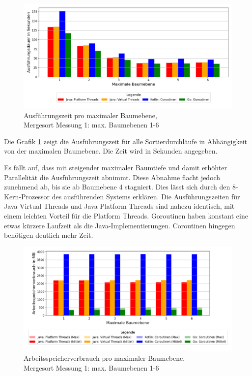 \documentclass[fontsize=12pt,paper=a4,twoside=semi,parskip=half-,headsepline,headinclude]{scrreprt}
\begin{document}
\begin{figure}[H]
	\centering
	\includegraphics[scale=0.5]{figures/mergesort/Maximalebauebenen1-6/execution_time_plot.png}
	\caption{Ausführungszeit pro maximaler Baumebene,\\ Mergesort Messung 1: max. Baumebenen 1-6}
	\label{fig:ms1-6Zeit}
\end{figure}

Die Grafik \ref{fig:ms1-6Zeit} zeigt die Ausführungszeit für alle Sortierdurchläufe in Abhängigkeit von der maximalen Baumebene. Die Zeit wird in Sekunden angegeben.

Es fällt auf, dass mit steigender maximaler Baumtiefe und damit erhöhter Parallelität die Ausführungszeit abnimmt. Diese Abnahme flacht jedoch zunehmend ab, bis sie ab Baumebene 4 stagniert. Dies lässt sich durch den 8-Kern-Prozessor des ausführenden Systems erklären. Die Ausführungszeiten für Java Virtual Threads und Java Platform Threads sind nahezu identisch, mit einem leichten Vorteil für die Platform Threads. Goroutinen haben konstant eine etwas kürzere Laufzeit als die Java-Implementierungen. Coroutinen hingegen benötigen deutlich mehr Zeit.

\begin{figure}[H]
	\centering
	\includegraphics[scale=0.5]{figures/mergesort/Maximalebauebenen1-6/memory_usage_bar_plot.png}
	\caption{Arbeitsspeicherverbrauch pro maximaler Baumebene,\\ Mergesort Messung 1: max. Baumebenen 1-6}
	\label{fig:ms1-6RAM}
\end{figure}
\end{document}
